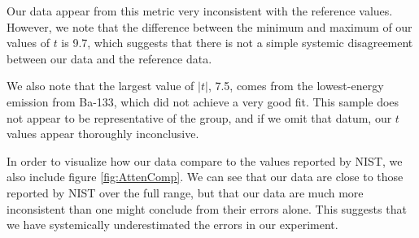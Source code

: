 \documentclass[letter]{article}
\begin{document}

Our data appear from this metric very inconsistent with the reference values. However, we note that the difference between the minimum and maximum of our values of $t$ is 9.7, which suggests that there is not a simple systemic disagreement between our data and the reference data.

We also note that the largest value of $|t|$, 7.5, comes from the lowest-energy emission from Ba-133, which did not achieve a very good fit. This sample does not appear to be representative of the group, and if we omit that datum, our $t$ values appear thoroughly inconclusive.

In order to visualize how our data compare to the values reported by NIST, we also include figure \ref{fig:AttenComp}. We can see that our data are close to those reported by NIST over the full range, but that our data are much more inconsistent than one might conclude from their errors alone. This suggests that we have systemically underestimated the errors in our experiment.

\end{document}
